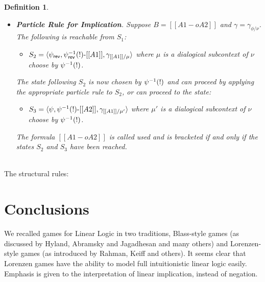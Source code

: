 \documentclass{article}
\newtheorem{definition}[theorem]{Definition}
\begin{document}
\begin{definition}
\begin{center}
\begin{itemize}
    \item[] \textbf{Particle Rule for Implication}. Suppose
      $B = [[A1 -o A2]]$ and $\gamma = \gamma_{\phi/\nu}$. The
      following is reachable from $S_1$:
      \begin{center}
        \begin{itemize}
        \item $S_2 = \langle \psi_{\mathsf{rev}}, 
                              \psi^{-1}_{\mathsf{rev}}(!)\text{-}[[A1]],
                              \gamma_{[[A1]]/\mu}
                     \rangle$ 
          where $\mu$ is a dialogical subcontext of $\nu$ choose by
          $\psi^{-1}(!)$.\\        
        \end{itemize}                
      \end{center}
      The state following $S_2$ is now chosen by $\psi^{-1}(!)$ and can
      proceed by applying the appropriate particle rule to $S_2$, or
      can proceed to the state:
      \begin{center}
        \begin{itemize}
        \item $S_3 = \langle \psi, 
                              \psi^{-1}(!)\text{-}[[A2]],
                              \gamma_{[[A1]]/\mu'}
                     \rangle$ 
              where $\mu'$ is a dialogical subcontext of $\nu$ choose by
              $\psi^{-1}(!)$.\\        
        \end{itemize}                
      \end{center}
      The formula $[[A1 -o A2]]$ is called used and is bracketed if
      and only if the states $S_2$ and $S_3$ have been reached.
    \end{itemize}
  \end{center}
\end{definition}


\ \\
\noindent
The structural rules:


 \section{Conclusions}
 We recalled games for Linear Logic in two traditions, Blass-style
 games (as discussed by Hyland, Abramsky and Jagadhesan and many
 others) and Lorenzen-style games (as introduced by Rahman, Keiff and
 others). It seems clear that Lorenzen games have the ability to model
 full intuitionistic linear logic easily. Emphasis is given to the
 interpretation of linear implication, instead of negation.
 
\end{document}
